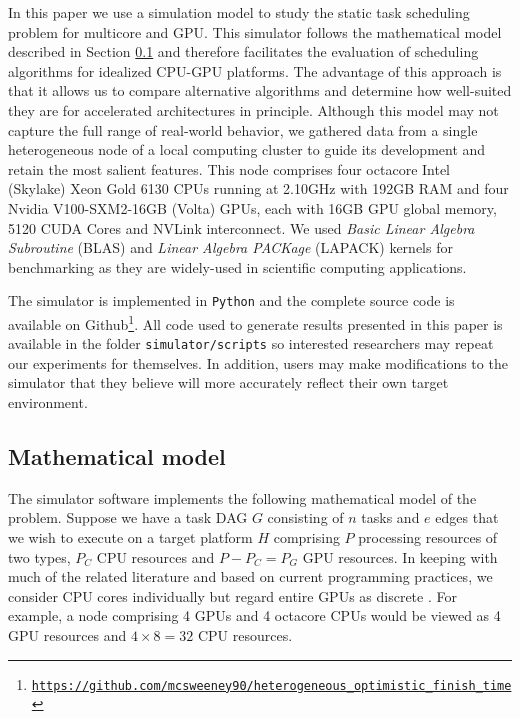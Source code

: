 \documentclass[runningheads]{llncs}
\begin{document}
In this paper we use a simulation model to study the static task scheduling problem for multicore and GPU. This simulator follows the mathematical model described in Section \ref{subsect.mathematical_model} and therefore facilitates the evaluation of scheduling algorithms for idealized CPU-GPU platforms. The advantage of this approach is that it allows us to compare alternative algorithms and determine how well-suited they are for accelerated architectures in principle. Although this model may not capture the full range of real-world behavior, we gathered data from a single heterogeneous node of a local computing cluster to guide its development and retain the most salient features. This node comprises four octacore Intel (Skylake) Xeon Gold 6130 CPUs running at 2.10GHz with 192GB RAM and four Nvidia V100-SXM2-16GB (Volta) GPUs, each with 16GB GPU global memory, 5120 CUDA Cores and NVLink interconnect. We used {\em Basic Linear Algebra Subroutine} (BLAS) \cite{Dongarra:1990:SLB:77626.79170} and {\em Linear Algebra PACKage} (LAPACK) \cite{laug} kernels for benchmarking as they are widely-used in scientific computing applications. 

The simulator is implemented in {\tt Python} and the complete source code is available on Github\footnote{\href{https://github.com/mcsweeney90/heterogeneous_optimistic_finish_time}{{\tt \small https://github.com/mcsweeney90/heterogeneous\_optimistic\_finish\_time}}}.
All code used to generate results presented in this paper is available in the folder {\tt simulator/scripts} so interested researchers may repeat our experiments for themselves. In addition, users may make modifications to the simulator that they believe will more accurately reflect their own target environment. 


\subsection{Mathematical model}
\label{subsect.mathematical_model}

The simulator software implements the following mathematical model of the problem. Suppose we have a task DAG $G$ consisting of $n$ tasks and $e$ edges that we wish to execute on a target platform $H$ comprising $P$ processing resources of two types, $P_C$ CPU resources and $P - P_C = P_G$ GPU resources. In keeping with much of the related literature and based on current programming practices, we consider CPU cores individually but regard entire GPUs as discrete \cite{agullo2016}. For example, a node comprising 4 GPUs and 4 octacore CPUs would be viewed as 4 GPU resources and $4 \times 8 = 32$ CPU resources.   
\end{document}
